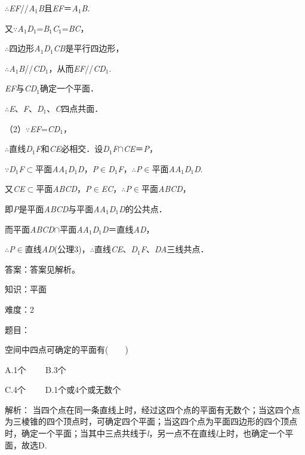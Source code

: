 \documentclass{article} %
\begin{document}
$\mathrm{\therefore}$\textit{EF}//\textit{A}${}_{1}$\textit{B}且\textit{EF}＝\textit{A}${}_{1}$\textit{B}.

又$\mathrm{\because}$\textit{A}${}_{1}$\textit{D}${}_{1}$=\textit{B}${}_{1}$\textit{C}${}_{1}$=\textit{BC}，

$\mathrm{\therefore}$四边形\textit{A}${}_{1}$\textit{D}${}_{1}$\textit{CB}是平行四边形，

$\mathrm{\therefore}$\textit{A}${}_{1}$\textit{B}//\textit{CD}${}_{1}$，从而\textit{EF}//\textit{CD}${}_{1}$.

\textit{EF}与\textit{CD}${}_{1}$确定一个平面．

$\mathrm{\therefore}$\textit{E}、\textit{F}、\textit{D}${}_{1}$、\textit{C}四点共面．

（2）$\mathrm{\because}$\textit{EF}=\textit{CD}${}_{1}$，

$\mathrm{\therefore}$直线\textit{D}${}_{1}$\textit{F}和\textit{CE}必相交．设\textit{D}${}_{1}$\textit{F}$\mathrm{\cap}$\textit{CE}＝\textit{P}，

$\mathrm{\because}$\textit{D}${}_{1}$\textit{F}$\mathrm{\subset }$平面\textit{AA}${}_{1}$\textit{D}${}_{1}$\textit{D}，\textit{P}$\mathrm{\in}$\textit{D}${}_{1}$\textit{F}，$\mathrm{\therefore}$\textit{P}$\mathrm{\in}$平面\textit{AA}${}_{1}$\textit{D}${}_{1}$\textit{D}.

又\textit{CE}$\mathrm{\subset }$平面\textit{ABCD}，\textit{P}$\mathrm{\in}$\textit{EC}，$\mathrm{\therefore}$\textit{P}$\mathrm{\in}$平面\textit{ABCD}，

即\textit{P}是平面\textit{ABCD}与平面\textit{AA}${}_{1}$\textit{D}${}_{1}$\textit{D}的公共点．

而平面\textit{ABCD}$\mathrm{\cap}$平面\textit{AA}${}_{1}$\textit{D}${}_{1}$\textit{D}＝直线\textit{AD}，

$\mathrm{\therefore}$\textit{P}$\mathrm{\in}$直线\textit{AD}(公理3)，$\mathrm{\therefore}$直线\textit{CE}、\textit{D}${}_{1}$\textit{F}、\textit{DA}三线共点．

答案：答案见解析。

知识：平面

难度：2

题目：

空间中四点可确定的平面有(　　)

A.1个　　  B.3个

C.4个　　  D.1个或4个或无数个

解析：
当四个点在同一条直线上时，经过这四个点的平面有无数个；当这四个点为三棱锥的四个顶点时，可确定四个平面；当这四个点为平面四边形的四个顶点时，确定一个平面；当其中三点共线于\textit{l}，另一点不在直线\textit{l}上时，也确定一个平面，故选D.
\end{document}
